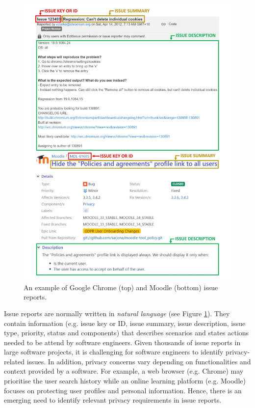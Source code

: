\begin{figure}[H]
	\centering
	\includegraphics[width=1\linewidth]{"Figures/issue_ex"}
	\caption{An example of Google Chrome (top) and Moodle (bottom) issue reports.}
	\label{fig:issue-example}
\end{figure}

Issue reports are normally written in \emph{natural language} (see Figure \ref{fig:issue-example}). They contain information (e.g. issue key or ID, issue summary, issue description, issue type, priority, status and components) that describes scenarios and states actions needed to be attend by software engineers. Given thousands of issue reports in large software projects, it is challenging for software engineers to identify privacy-related issues. In addition, privacy concerns vary depending on functionalities and context provided by a software. For example, a web browser (e.g. Chrome) may prioritise the user search history while an online learning platform (e.g. Moodle) focuses on protecting user profiles and personal information. Hence, there is an emerging need to identify relevant privacy requirements in issue reports.

